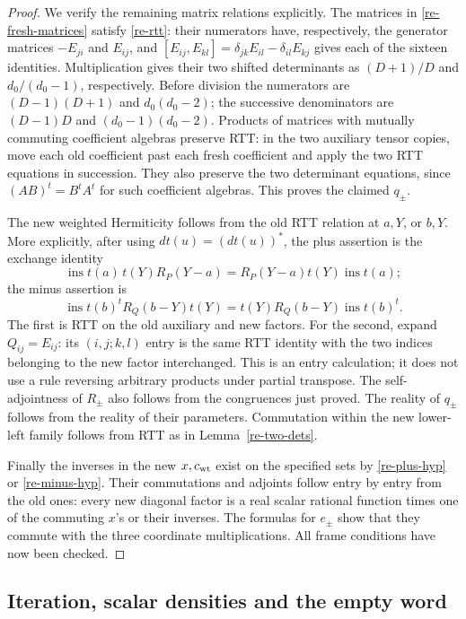 \begin{proof}
We verify the remaining matrix relations explicitly.
The matrices in \eqref{re-fresh-matrices} satisfy
\eqref{re-rtt}: their numerators have, respectively, the
generator matrices \(-E_{ji}\) and \(E_{ij}\), and
\([E_{ij},E_{kl}]=\delta_{jk}E_{il}-\delta_{il}E_{kj}\)
gives each of the sixteen identities.
Multiplication gives their two shifted determinants as
\((D+1)/D\) and \(d_0/(d_0-1)\), respectively.
Before division the numerators are
\((D-1)(D+1)\) and \(d_0(d_0-2)\); the successive
denominators are \((D-1)D\) and
\((d_0-1)(d_0-2)\).
Products of matrices with mutually commuting coefficient
algebras preserve RTT: in the two auxiliary tensor copies,
move each old coefficient past each fresh coefficient and
apply the two RTT equations in succession.
They also preserve the two determinant equations, since
\((AB)^t=B^tA^t\) for such coefficient algebras.
This proves the claimed \(q_\pm\).

The new weighted Hermiticity follows from the old RTT
relation at \(a,Y\), or \(b,Y\).  More explicitly, after
using \(dt(u)=(dt(u))^*\), the plus assertion is the exchange
identity
\[
 \operatorname{ins}t(a)\,t(Y)R_P(Y-a)
       =R_P(Y-a)t(Y)\operatorname{ins}t(a);
\]
the minus assertion is
\[
 \operatorname{ins}t(b)^t R_Q(b-Y)t(Y)
       =t(Y)R_Q(b-Y)\operatorname{ins}t(b)^t.
\]
The first is RTT on the old auxiliary and new factors.
For the second, expand \(Q_{ij}=E_{ij}\): its
\((i,j;k,l)\) entry is the same RTT identity with the two
indices belonging to the new factor interchanged.
This is an entry calculation; it does not use a rule
reversing arbitrary products under partial transpose.
The self-adjointness of \(R_\pm\) also follows from the
congruences just proved.  The reality of \(q_\pm\) follows
from the reality of their parameters.
Commutation within the new lower-left family follows from
RTT as in Lemma~\ref{re-two-dets}.

Finally the inverses in the new \(x,c_{\rm wt}\) exist on
the specified sets by \eqref{re-plus-hyp} or
\eqref{re-minus-hyp}.  Their commutations and adjoints
follow entry by entry from the old ones: every new
diagonal factor is a real scalar rational function times
one of the commuting \(x\)'s or their inverses.
The formulas for \(e_\pm\) show that they commute with
the three coordinate multiplications.
All frame conditions have now been checked.
\end{proof}

\subsection{Iteration, scalar densities and the empty word}

